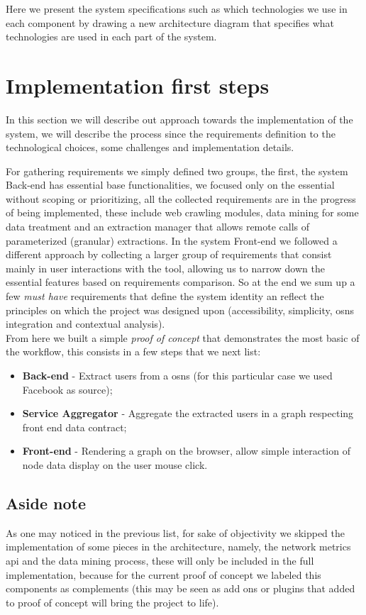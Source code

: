 Here we present the system specifications such as which technologies we use in each component by drawing a new architecture diagram that specifies what technologies are used in each part of the system.

\section{Implementation first steps}
In this section we will describe out approach towards the implementation of the system, we will describe the process since the requirements
definition to the technological choices, some challenges and implementation details.

For gathering requirements we simply defined two groups, the first, the system Back-end has essential base functionalities, we focused only
on the essential without scoping or prioritizing, all the collected requirements are in the progress of being implemented, these include
web crawling modules, data mining for some data treatment and an extraction manager that allows remote calls of parameterized (granular) extractions.
In the system Front-end we followed a different approach by collecting a larger group of requirements that consist mainly in user interactions with the tool,
allowing us to narrow down the essential features based on requirements comparison. So at the end we sum up a few \textit{must have} requirements that
define the system identity an reflect the principles on which the project was designed upon (accessibility, simplicity, \glspl{osn} integration and contextual analysis).\\

\indent From here we built a simple \textit{proof of concept} that demonstrates the most basic of the workflow, this consists in a few steps that we next list:
\begin{itemize}
    \item \textbf{Back-end} - Extract users from a \glspl{osn} (for this particular case we used Facebook as source);
    \item \textbf{Service Aggregator} - Aggregate the extracted users in a graph respecting front end data contract;
    \item \textbf{Front-end} - Rendering a graph on the browser, allow simple interaction of node data display on the user mouse click.
\end{itemize}

\subsection*{Aside note}
As one may noticed in the previous list, for sake of objectivity we skipped the implementation of some pieces in the architecture,
namely, the network metrics \gls{api} and the data mining process, these will only be included in the full implementation, because for the current proof
of concept we labeled this components as complements (this may be seen as add ons or plugins that added to proof of concept will bring the
project to life).\\

